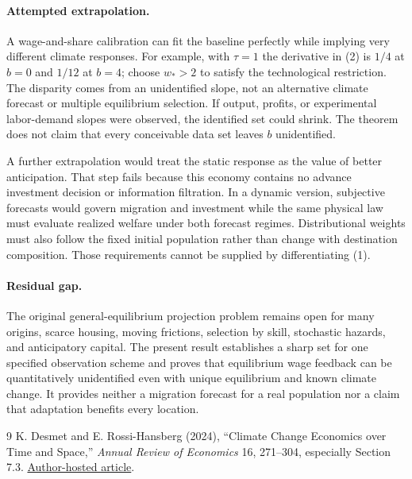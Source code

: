 \documentclass[11pt]{article}
\theoremstyle{definition}
\begin{document}
\paragraph{Attempted extrapolation.}
A wage-and-share calibration can fit the baseline perfectly while implying very different climate responses. For example, with $\tau=1$ the derivative in (2) is $1/4$ at $b=0$ and $1/12$ at $b=4$; choose $w_*>2$ to satisfy the technological restriction. The disparity comes from an unidentified slope, not an alternative climate forecast or multiple equilibrium selection. If output, profits, or experimental labor-demand slopes were observed, the identified set could shrink. The theorem does not claim that every conceivable data set leaves $b$ unidentified.

A further extrapolation would treat the static response as the value of better anticipation. That step fails because this economy contains no advance investment decision or information filtration. In a dynamic version, subjective forecasts would govern migration and investment while the same physical law must evaluate realized welfare under both forecast regimes. Distributional weights must also follow the fixed initial population rather than change with destination composition. Those requirements cannot be supplied by differentiating (1).

\paragraph{Residual gap.}
The original general-equilibrium projection problem remains open for many origins, scarce housing, moving frictions, selection by skill, stochastic hazards, and anticipatory capital. The present result establishes a sharp set for one specified observation scheme and proves that equilibrium wage feedback can be quantitatively unidentified even with unique equilibrium and known climate change. It provides neither a migration forecast for a real population nor a claim that adaptation benefits every location.

\begin{thebibliography}{9}
 K. Desmet and E. Rossi-Hansberg (2024), ``Climate Change Economics over Time and Space,'' \emph{Annual Review of Economics} 16, 271--304, especially Section 7.3. \href{https://rossihansberg.economics.uchicago.edu/CCETS.pdf}{Author-hosted article}.
\end{thebibliography}
\end{document}
